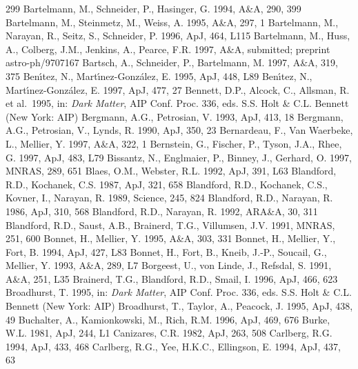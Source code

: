 \documentclass[a4paper,10pt]{article} %
\begin{document}
\begin{thebibliography}{299}
  Bartelmann, M., Schneider, P., Hasinger, G. 1994, A\&A, 290, 399
  Bartelmann, M., Steinmetz, M., Weiss, A. 1995, A\&A, 297, 1
  Bartelmann, M., Narayan, R., Seitz, S., Schneider, P. 1996, ApJ,
  464, L115
  Bartelmann, M., Huss, A., Colberg, J.M., Jenkins, A., Pearce, F.R.
  1997, A\&A, submitted; preprint astro-ph/9707167
  Bartsch, A., Schneider, P., Bartelmann, M. 1997, A\&A, 319, 375
  Ben{\'\i}tez, N., Mart{\'\i}nez-Gonz\'alez, E. 1995, ApJ, 448, L89
  Ben{\'\i}tez, N., Mart{\'\i}nez-Gonz\'alez, E. 1997, ApJ, 477, 27
  Bennett, D.P., Alcock, C., Allsman, R. et al.\ 1995, in: {\em Dark
  Matter\/}, AIP Conf. Proc. 336, eds. S.S. Holt \& C.L. Bennett (New
  York: AIP)
  Bergmann, A.G., Petrosian, V. 1993, ApJ, 413, 18
  Bergmann, A.G., Petrosian, V., Lynds, R. 1990, ApJ, 350, 23
  Bernardeau, F., Van Waerbeke, L., Mellier, Y. 1997, A\&A, 322, 1
  Bernstein, G., Fischer, P., Tyson, J.A., Rhee, G. 1997, ApJ, 483,
  L79
  Bissantz, N., Englmaier, P., Binney, J., Gerhard, O. 1997, MNRAS,
  289, 651
  Blaes, O.M., Webster, R.L. 1992, ApJ, 391, L63
  Blandford, R.D., Kochanek, C.S. 1987, ApJ, 321, 658
  Blandford, R.D., Kochanek, C.S., Kovner, I., Narayan, R. 1989,
  Science, 245, 824
  Blandford, R.D., Narayan, R. 1986, ApJ, 310, 568
  Blandford, R.D., Narayan, R. 1992, ARA\&A, 30, 311
  Blandford, R.D., Saust, A.B., Brainerd, T.G., Villumsen, J.V. 1991,
  MNRAS, 251, 600
  Bonnet, H., Mellier, Y. 1995, A\&A, 303, 331
  Bonnet, H., Mellier, Y., Fort, B. 1994, ApJ, 427, L83
  Bonnet, H., Fort, B., Kneib, J.-P., Soucail, G., Mellier, Y. 1993,
  A\&A, 289, L7
  Borgeest, U., von Linde, J., Refsdal, S. 1991, A\&A, 251, L35
  Brainerd, T.G., Blandford, R.D., Smail, I. 1996, ApJ, 466, 623
  Broadhurst, T. 1995, in: {\em Dark Matter\/}, AIP Conf. Proc. 336,
  eds. S.S. Holt \& C.L. Bennett (New York: AIP)
  Broadhurst, T., Taylor, A., Peacock, J. 1995, ApJ, 438, 49
  Buchalter, A., Kamionkowski, M., Rich, R.M. 1996, ApJ, 469, 676
  Burke, W.L. 1981, ApJ, 244, L1
  Canizares, C.R. 1982, ApJ, 263, 508
  Carlberg, R.G. 1994, ApJ, 433, 468
  Carlberg, R.G., Yee, H.K.C., Ellingson, E. 1994, ApJ, 437, 63

\end{thebibliography}
\end{document}
